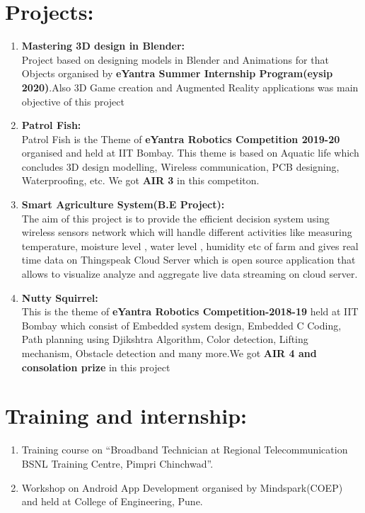\documentclass[margin,line]{res}
\begin{document}
\begin{resume}
\hfill 

\section{\bf{\Large{Projects:}}}
\begin{enumerate}
	
	\item{{\textbf{\large{Mastering 3D design in Blender:}}}\\
	Project based on designing models in Blender and Animations for that Objects organised by \textbf{eYantra Summer Internship Program(eysip 2020)}.Also 3D Game creation and Augmented Reality applications was main objective of this project
	}
	
	\item{{\textbf{\large{Patrol Fish:}}}\\
	Patrol Fish is the Theme of \textbf{eYantra Robotics Competition 2019-20} organised and held at IIT Bombay. This theme is based on Aquatic life which concludes 3D design modelling, Wireless communication, PCB designing, Waterproofing, etc. We got \textbf{AIR 3} in this competiton.
	}
	
	
\item{{\textbf{\large{Smart Agriculture System(B.E Project):}}}\\
	The aim of this project is to provide the efficient decision system using wireless
sensors network which will handle different activities like measuring temperature,
moisture level , water level , humidity etc of farm and gives  real time data on Thingspeak Cloud Server 
which is open source application that  allows to
visualize analyze and aggregate live data streaming on cloud server.}


	
	\item{{\textbf{\large{Nutty Squirrel:}}}\\ This is the theme of \textbf{eYantra Robotics Competition-2018-19} held at IIT Bombay which consist of Embedded system design, Embedded C Coding, Path planning using Djikshtra  Algorithm, Color detection, Lifting mechanism, Obstacle detection and many more.We got \textbf{AIR 4 and consolation prize} in this project   }
	
\end{enumerate}
\hfill



{\section{\Large\bf{Training and internship:}}}
\begin{enumerate}
\vspace{0.5cm}
	\item{Training course on “Broadband Technician at Regional Telecommunication BSNL Training Centre, Pimpri Chinchwad”. }	
\item Workshop on Android App Development organised by Mindspark(COEP) and held at College of Engineering, Pune.
\end{enumerate}
\hfill


\end{resume}
\end{document}
